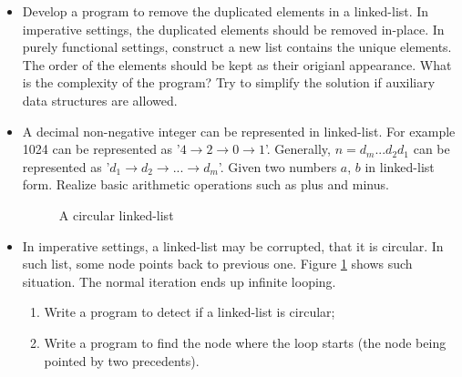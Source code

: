 \documentclass[b5paper]{article}
\begin{document}
\begin{Exercise}
\begin{itemize}
\item Develop a program to remove the duplicated elements in a linked-list.
In imperative settings, the duplicated elements should be removed in-place. In purely functional
settings, construct a new list contains the unique elements. The order of the elements
should be kept as their origianl appearance. What is the complexity of the
program? Try to simplify the solution if auxiliary data structures are allowed.
\item A decimal non-negative integer can be represented in linked-list. For example 1024 can be represented as
'$4 \rightarrow 2 \rightarrow 0 \rightarrow 1$'. Generally, $n = d_m...d_2d_1$ can be represented as
'$d_1 \rightarrow d_2 \rightarrow ... \rightarrow d_m$'. Given two numbers $a$, $b$ in linked-list form.
Realize basic arithmetic operations such as plus and minus.
\begin{figure}[htbp]
\centering
{}
\caption{A circular linked-list}
\label{fig:circular-list}
\end{figure}

\item In imperative settings, a linked-list may be corrupted, that it is circular. In such list, some node
points back to previous one. Figure \ref{fig:circular-list} shows such situation.
The normal iteration ends up infinite looping.
  \begin{enumerate}
    \item Write a program to detect if a linked-list is circular;
    \item Write a program to find the node where the loop starts (the node being pointed by two precedents).
  \end{enumerate}

\end{itemize}

\end{Exercise}
\end{document}
